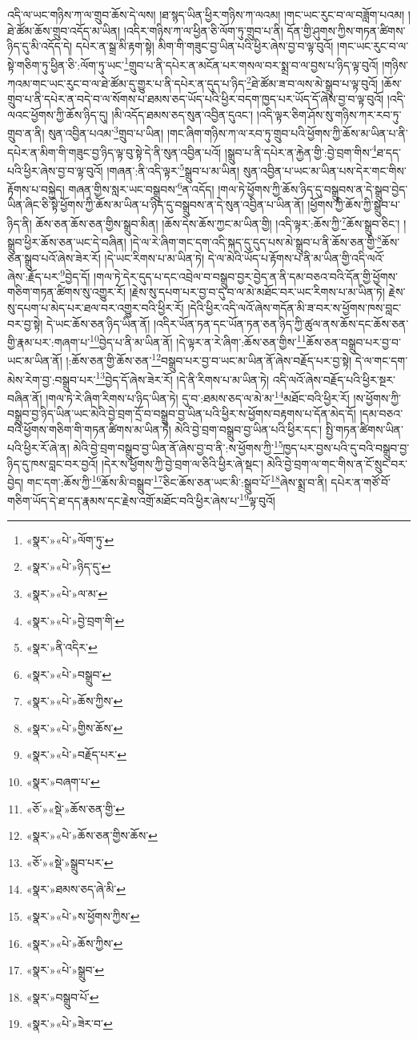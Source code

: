 འདི་ལ་ཡང་གཉིས་ཀ་ལ་གྲུབ་ཆོས་དེ་ལས། །ཐ་སྙད་ཡིན་ཕྱིར་གཉིས་ཀ་ལའམ། །གང་ཡང་རུང་བ་ལ་བཟློག་པའམ། །ཐེ་ཚོམ་ཆོས་གྲུབ་འདོད་མ་ཡིན། །འདིར་གཉིས་ཀ་ལ་ཕྱིན་ཅི་ལོག་ཏུ་གྲུབ་པ་ནི། དོན་གྱི་ཤུགས་ཀྱིས་གཏན་ཚིགས་ཉིད་དུ་མི་འདོད་དེ། དཔེར་ན་སྒྲ་མི་རྟག་སྟེ། མིག་གི་གཟུང་བྱ་ཡིན་པའི་ཕྱིར་ཞེས་བྱ་བ་ལྟ་བུའོ། །གང་ཡང་རུང་བ་ལ་སྟེ་གཅིག་ཏུ་ཕྱིན་ཅི་:ལོག་ཏུ་ཡང་\footnote{«སྣར་»«པེ་»ལོག་ཏུ་}གྲུབ་པ་ནི་དཔེར་ན་མངོན་པར་གསལ་བར་སྨྲ་བ་ལ་བྱས་པ་ཉིད་ལྟ་བུའོ། །གཉིས་ཀའམ་གང་ཡང་རུང་བ་ལ་ཐེ་ཚོམ་དུ་གྱུར་པ་ནི་དཔེར་ན་དུད་པ་ཉིད་\footnote{«སྣར་»«པེ་»ཉིད་དུ་}ཐེ་ཚོམ་ཟ་བ་ལས་མེ་སྒྲུབ་པ་ལྟ་བུའོ། །ཆོས་གྲུབ་པ་ནི་དཔེར་ན་བདེ་བ་ལ་སོགས་པ་ཐམས་ཅད་ཡོད་པའི་ཕྱིར་བདག་ཁྱད་པར་ཡོད་དོ་ཞེས་བྱ་བ་ལྟ་བུའོ། །འདི་ལའང་ཕྱོགས་ཀྱི་ཆོས་ཉིད་དུ། །མི་འདོད་ཐམས་ཅད་སུན་འབྱིན་དུའང་། །འདི་ལྟར་ཅིག་ཤོས་སུ་གཉིས་ཀར་རབ་ཏུ་གྲུབ་ན་ནི། སུན་འབྱིན་པའམ་\footnote{«སྣར་»«པེ་»ལ་མ་}གྲུབ་པ་ཡིན། །གང་ཞིག་གཉིས་ཀ་ལ་རབ་ཏུ་གྲུབ་པའི་ཕྱོགས་ཀྱི་ཆོས་མ་ཡིན་པ་ནི་དཔེར་ན་མིག་གི་གཟུང་བྱ་ཉིད་ལྟ་བུ་སྟེ་དེ་ནི་སུན་འབྱིན་པའོ། །སྒྲུབ་པ་ནི་དཔེར་ན་རྐྱེན་གྱི་:བྱེ་བྲག་གིས་\footnote{«སྣར་»«པེ་»བྱེ་བྲག་གི་}ཐ་དད་པའི་ཕྱིར་ཞེས་བྱ་བ་ལྟ་བུའོ། །གཞན་:ནི་འདི་ལྟར་\footnote{«སྣར་»ནི་འདིར་}སྒྲུབ་པ་མ་ཡིན། སུན་འབྱིན་པ་ཡང་མ་ཡིན་པས་དེར་གང་གིས་རྟོགས་པ་བསྐྱེད། གཞན་གྱིས་སླར་ཡང་བསྒྲུབས་\footnote{«སྣར་»«པེ་»བསྒྲུབ་}ན་འདོད། །གལ་ཏེ་ཕྱོགས་ཀྱི་ཆོས་ཉིད་དུ་བསྒྲུབས་ན་དེ་སྒྲུབ་བྱེད་ཡིན་ཞིང་ཅི་སྟེ་ཕྱོགས་ཀྱི་ཆོས་མ་ཡིན་པ་ཉིད་དུ་བསྒྲུབས་ན་དེ་སུན་འབྱིན་པ་ཡིན་ནོ། །ཕྱོགས་ཀྱི་ཆོས་ཀྱི་སྒྲུབ་པ་ཉིད་ནི། ཆོས་ཅན་ཆོས་ཅན་གྱིས་སྒྲུབ་མིན། །ཆོས་དེས་ཆོས་ཀྱང་མ་ཡིན་གྱི། །འདི་ལྟར་:ཆོས་ཀྱི་\footnote{«སྣར་»«པེ་»ཆོས་ཀྱིས་}ཆོས་སྒྲུབ་ཅིང་། །སྒྲུབ་ཕྱིར་ཆོས་ཅན་ཡང་དེ་བཞིན། །དེ་ལ་རེ་ཞིག་གང་དག་འདི་སྐད་དུ་དུད་པས་མེ་སྒྲུབ་པ་ནི་ཆོས་ཅན་གྱི་\footnote{«སྣར་»«པེ་»གྱིས་ཆོས་}ཆོས་ཅན་སྒྲུབ་པའོ་ཞེས་ཟེར་རོ། །དེ་ཡང་རིགས་པ་མ་ཡིན་ཏེ། དེ་ལ་མེའི་ཡོད་པ་རྟོགས་པ་ནི་མ་ཡིན་གྱི་འདི་ལའོ་ཞེས་:རྗོད་པར་\footnote{«སྣར་»«པེ་»བརྗོད་པར་}བྱེད་དོ། །གལ་ཏེ་དེར་དུད་པ་དང་འབྲེལ་བ་བསྒྲུབ་བྱར་བྱེད་ན་ནི་དམ་བཅའ་བའི་དོན་གྱི་ཕྱོགས་གཅིག་གཏན་ཚིགས་སུ་འགྱུར་རོ། །རྗེས་སུ་དཔག་པར་བྱ་བ་དུ་བ་ལ་མེ་མཐོང་བར་ཡང་རིགས་པ་མ་ཡིན་ཏེ། རྗེས་སུ་དཔག་པ་མེད་པར་ཐལ་བར་འགྱུར་བའི་ཕྱིར་རོ། །དེའི་ཕྱིར་འདི་ལའོ་ཞེས་གདོན་མི་ཟ་བར་ས་ཕྱོགས་ཁས་བླང་བར་བྱ་སྟེ། དེ་ཡང་ཆོས་ཅན་ཉིད་ཡིན་ནོ། །འདིར་ཡོན་ཏན་དང་ཡོན་ཏན་ཅན་ཉིད་ཀྱི་ཚུལ་ནས་ཆོས་དང་ཆོས་ཅན་གྱི་རྣམ་པར་:གཞག་པ་\footnote{«སྣར་»བཞག་པ་}བྱེད་པ་ནི་མ་ཡིན་ནོ། །དེ་ལྟར་ན་རེ་ཞིག་:ཆོས་ཅན་གྱིས་\footnote{«ཅོ་»«སྡེ་»ཆོས་ཅན་གྱི་}ཆོས་ཅན་བསྒྲུབ་པར་བྱ་བ་ཡང་མ་ཡིན་ནོ། །:ཆོས་ཅན་གྱི་ཆོས་ཅན་\footnote{«སྣར་»«པེ་»ཆོས་ཅན་གྱིས་ཆོས་}བསྒྲུབ་པར་བྱ་བ་ཡང་མ་ཡིན་ནོ་ཞེས་བརྗོད་པར་བྱ་སྟེ། དེ་ལ་གང་དག་མེས་རེག་བྱ་:བསྒྲུབ་པར་\footnote{«ཅོ་»«སྡེ་»སྒྲུབ་པར་}བྱེད་དོ་ཞེས་ཟེར་རོ། །དེ་ནི་རིགས་པ་མ་ཡིན་ཏེ། འདི་ལའོ་ཞེས་བརྗོད་པའི་ཕྱིར་སྔར་བཞིན་ནོ། །གལ་ཏེ་རེ་ཞིག་རིགས་པ་ཉིད་ཡིན་ཏེ། དུ་བ་:ཐམས་ཅད་ལ་མེ་མ་\footnote{«སྣར་»ཐམས་ཅད་ཞེ་མི་}མཐོང་བའི་ཕྱིར་རོ། །ས་ཕྱོགས་ཀྱི་བསྒྲུབ་བྱ་ཉིད་ཡིན་ཡང་མེའི་བྱེ་བྲག་དྲོ་བ་བསྒྲུབ་བྱ་ཡིན་པའི་ཕྱིར་ས་ཕྱོགས་བརྟགས་པ་དོན་མེད་དོ། །དམ་བཅའ་བའི་ཕྱོགས་གཅིག་གི་གཏན་ཚིགས་མ་ཡིན་ཏེ། མེའི་བྱེ་བྲག་བསྒྲུབ་བྱ་ཡིན་པའི་ཕྱིར་དང་། སྤྱི་གཏན་ཚིགས་ཡིན་པའི་ཕྱིར་རོ་ཞེ་ན། མེའི་བྱེ་བྲག་བསྒྲུབ་བྱ་ཡིན་ནོ་ཞེས་བྱ་བ་ནི་:ས་ཕྱོགས་ཀྱི་\footnote{«སྣར་»«པེ་»ས་ཕྱོགས་ཀྱིས་}ཁྱད་པར་བྱས་པའི་དུ་བའི་བསྒྲུབ་བྱ་ཉིད་དུ་ཁས་བླང་བར་བྱའོ། །དེར་ས་ཕྱོགས་ཀྱི་བྱེ་བྲག་ལ་ཅིའི་ཕྱིར་ཞེ་སྡང་། མེའི་བྱེ་བྲག་ལ་གང་གིས་ན་ངོ་སྲུང་བར་བྱེད། གང་དག་:ཆོས་ཀྱི་\footnote{«སྣར་»«པེ་»ཆོས་ཀྱིས་}ཆོས་མི་བསྒྲུབ་\footnote{«སྣར་»«པེ་»སྒྲུབ་}ཅིང་ཆོས་ཅན་ཡང་མི་:སྒྲུབ་པོ་\footnote{«སྣར་»བསྒྲུབ་པོ་}ཞེས་སྨྲ་བ་ནི། དཔེར་ན་གཙོ་བོ་གཅིག་ཡོད་དེ་ཐ་དད་རྣམས་དང་རྗེས་འགྲོ་མཐོང་བའི་ཕྱིར་ཞེས་པ་\footnote{«སྣར་»«པེ་»ཟེར་བ་}ལྟ་བུའོ། 